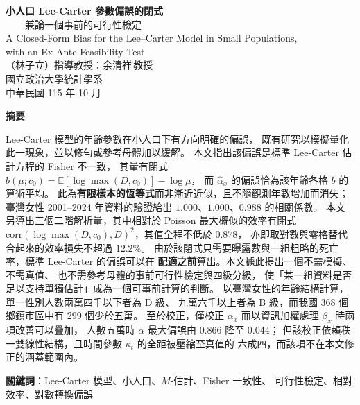 \documentclass[UTF8, fontset=macnew, a4paper, 12pt]{ctexart}
\newcommand{\Ex}{\mathbb{E}}
\begin{document}

\begin{center}
{\bfseries 小人口 Lee-Carter 參數偏誤的閉式}\\[4pt]
{ ——兼論一個事前的可行性檢定}\\[6pt]
{ A Closed-Form Bias for the Lee--Carter Model in Small Populations,}\\[2pt]
{ with an Ex-Ante Feasibility Test}\\[12pt]
{ （林子立）\quad 指導教授：余清祥\,教授}\\[4pt]
{ 國立政治大學統計學系}\\[4pt]
{ 中華民國 115 年 10 月}
\end{center}

\vspace{6pt}
\begin{center}
\begin{minipage}{0.92\textwidth}
\small
\textbf{摘要}\par\vspace{4pt}
Lee-Carter 模型的年齡參數在小人口下有方向明確的偏誤，
既有研究以模擬量化此一現象，並以修勻或參考母體加以緩解。
本文指出該偏誤是標準 Lee-Carter 估計方程的 Fisher 不一致，
其量有閉式 $b(\mu;c_0)=\Ex[\log\max(D,c_0)]-\log\mu$，
而 $\hat\alpha_x$ 的偏誤恰為該年齡各格 $b$ 的算術平均。
此為\textbf{有限樣本的恆等式}而非漸近近似，且不隨觀測年數增加而消失；
臺灣女性 2001--2024 年資料的驗證給出 $1.000$、$1.000$、$0.988$ 的相關係數。
本文另導出三個二階解析量，其中相對於 Poisson 最大概似的效率有閉式
$\mathrm{corr}(\log\max(D,c_0),D)^2$，其值全程不低於 $0.878$，
亦即取對數與零格替代合起來的效率損失不超過 $12.2\%$。
由於該閉式只需要曝露數與一組粗略的死亡率，標準 Lee-Carter 的偏誤可以在
\textbf{配適之前}算出。本文據此提出一個不需模擬、不需真值、
也不需參考母體的事前可行性檢定與四級分級，
使「某一組資料是否足以支持單獨估計」成為一個可事前計算的判斷。
以臺灣女性的年齡結構計算，單一性別人數兩萬四千以下者為 D 級、
九萬六千以上者為 B 級，而我國 368 個鄉鎮市區中有 299 個少於五萬。
至於校正，僅校正 $\alpha_x$ 而以資訊加權處理 $\beta_x$ 時兩項改善可以疊加，
人數五萬時 $\alpha$ 最大偏誤由 $0.866$ 降至 $0.044$；
但該校正依賴秩一雙線性結構，且時間參數 $\kappa_t$ 的全距被壓縮至真值的
六成四，而該項不在本文修正的涵蓋範圍內。
\par\vspace{6pt}
\textbf{關鍵詞}：Lee-Carter 模型、小人口、$M$-估計、Fisher 一致性、
可行性檢定、相對效率、對數轉換偏誤
\end{minipage}
\end{center}
\end{document}
